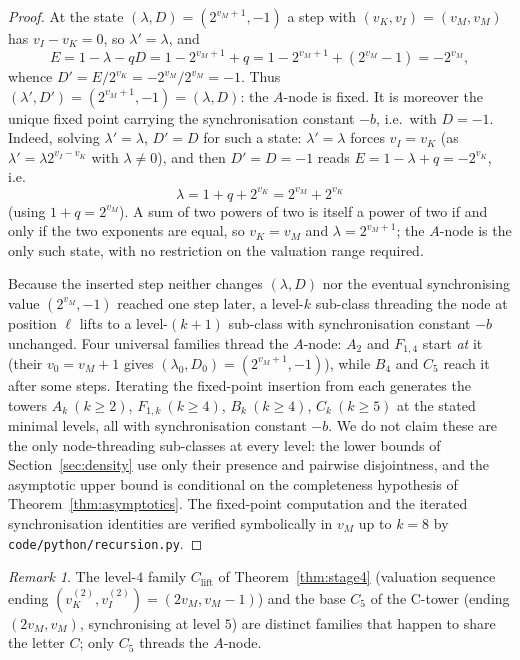 \documentclass[11pt,reqno]{amsart}
\theoremstyle{plain}
\theoremstyle{definition}
\theoremstyle{remark}
\newtheorem{remark}[theorem]{Remark}
\newcommand{\vk}{v_{K}}
\newcommand{\vi}{v_{I}}
\newcommand{\vM}{v_{M}}
\newcommand{\srcpath}[1]{\nolinkurl{#1}}
\begin{document}
\begin{proof}
At the state $(\lambda, D) = (2^{\vM + 1}, -1)$ a step with
$(\vk, \vi) = (\vM, \vM)$ has $\vi - \vk = 0$, so $\lambda' = \lambda$, and
\[
E = 1 - \lambda - q D = 1 - 2^{\vM + 1} + q
  = 1 - 2^{\vM + 1} + (2^{\vM} - 1) = -2^{\vM},
\]
whence $D' = E/2^{\vk} = -2^{\vM}/2^{\vM} = -1$. Thus
$(\lambda', D') = (2^{\vM + 1}, -1) = (\lambda, D)$: the $A$-node is fixed.
It is moreover the unique fixed point carrying the synchronisation constant
$-b$, i.e.\ with $D = -1$. Indeed, solving $\lambda' = \lambda$, $D' = D$ for
such a state: $\lambda' = \lambda$ forces $\vi = \vk$ (as $\lambda' =
\lambda 2^{\vi - \vk}$ with $\lambda \ne 0$), and then $D' = D = -1$ reads
$E = 1 - \lambda + q = -2^{\vk}$, i.e.\
\[
\lambda = 1 + q + 2^{\vk} = 2^{\vM} + 2^{\vk}
\]
(using $1 + q = 2^{\vM}$). A sum of two powers of two is itself a power of
two if and only if the two exponents are equal, so $\vk = \vM$ and
$\lambda = 2^{\vM + 1}$; the $A$-node is the only such state, with no
restriction on the valuation range required.

Because the inserted step neither changes $(\lambda, D)$ nor the eventual
synchronising value $(2^{\vM}, -1)$ reached one step later, a level-$k$
sub-class threading the node at position $\ell$ lifts to a level-$(k+1)$
sub-class with synchronisation constant $-b$ unchanged. Four universal
families thread the $A$-node: $A_2$ and $F_{1,4}$ start \emph{at} it (their
$v_0 = \vM + 1$ gives $(\lambda_0, D_0) = (2^{\vM + 1}, -1)$), while $B_4$ and
$C_5$ reach it after some steps. Iterating the fixed-point insertion from each
generates the towers $A_k\ (k \ge 2)$, $F_{1,k}\ (k \ge 4)$, $B_k\ (k \ge 4)$,
$C_k\ (k \ge 5)$ at the stated minimal levels, all with synchronisation
constant $-b$. We do not claim these are the only node-threading sub-classes
at every level: the lower bounds of Section~\ref{sec:density} use only their
presence and pairwise disjointness, and the asymptotic upper bound is
conditional on the completeness hypothesis of Theorem~\ref{thm:asymptotics}.
The fixed-point computation and the iterated synchronisation identities are
verified symbolically in $\vM$ up to $k = 8$ by \srcpath{code/python/recursion.py}.
\end{proof}

\begin{remark}
The level-$4$ family $C_{\mathrm{lift}}$ of Theorem~\ref{thm:stage4} (valuation
sequence ending $(\vk^{(2)}, \vi^{(2)}) = (2\vM, \vM - 1)$) and the base $C_5$
of the C-tower (ending $(2\vM, \vM)$, synchronising at level $5$) are distinct
families that happen to share the letter $C$; only $C_5$ threads the $A$-node.
\end{remark}
\end{document}
